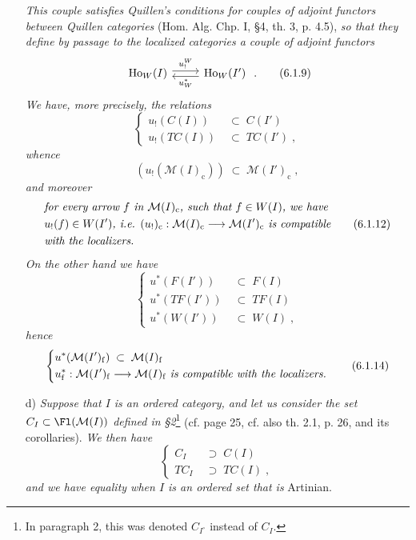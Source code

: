 \begin{itemize}[leftmargin=2.5em]
\textit{This couple satisfies Quillen's conditions for couples of adjoint functors between Quillen categories} (Hom. Alg. Chp. I, §4, th. 3, p. 4.5), \textit{so that they define by passage to the localized categories a couple of adjoint functors}
\[
\begin{tikzcd}
\mathrm{Ho}_W(I) \arrow[r, shift left, "u_!^{W}"] & \mathrm{Ho}_W(I') \arrow[l, shift left, "u^{*}_{W}"]
\end{tikzcd}
\;.
\tag*{(6.1.9)}
\]
\textit{We have, more precisely, the relations}
\[
\left\{
\begin{aligned}
u_!(C(I)) \;&\subset\; C(I')\\
u_!(TC(I)) \;&\subset\; TC(I')\;,
\end{aligned}
\right.
\tag*{(6.1.10)}
\]
\textit{whence}
\[
(u_!(\mathcal{M}(I)_{\mathrm{c}})) \;\subset\; \mathcal{M}(I')_{\mathrm{c}}\;,
\tag*{(6.1.11)}
\]
\textit{and moreover}
\[
\begin{aligned}
&\text{\textit{for every arrow $f$ in $\mathcal{M}(I)_{\mathrm{c}}$, such that $f \in W(I)$, we have}}\\
&\text{\textit{$u_!(f) \in W(I')$, i.e. $(u_!)_{\mathrm{c}} : \mathcal{M}(I)_{\mathrm{c}} \longrightarrow \mathcal{M}(I')_{\mathrm{c}}$ is compatible}}\\
&\text{\textit{with the localizers.}}
\end{aligned}
\tag*{(6.1.12)}
\]
\textit{On the other hand we have}
\[
\left\{
\begin{aligned}
u^{*}(F(I')) \;&\subset\; F(I)\\
u^{*}(TF(I')) \;&\subset\; TF(I)\\
u^{*}(W(I')) \;&\subset\; W(I)\;,
\end{aligned}
\right.
\tag*{(6.1.13)}
\]
\textit{hence}
\[
\left\{
\begin{aligned}
&u^{*}(\mathcal{M}(I')_{\mathrm{f}}) \;\subset\; \mathcal{M}(I)_{\mathrm{f}}\\
&u^{*}_{\mathrm{f}} : \mathcal{M}(I')_{\mathrm{f}} \longrightarrow \mathcal{M}(I)_{\mathrm{f}} \text{ \textit{is compatible with the localizers.}}
\end{aligned}
\right.
\tag*{(6.1.14)}
\]

\item[d)] \textit{Suppose that $I$ is an ordered category, and let us consider the set $C_I \subset \Fl(\mathcal{M}(I))$ defined in §2}\footnote[30]{In paragraph 2, this was denoted $C_{I^{\circ}}$ instead of $C_I$.} (cf. page 25, cf. also th. 2.1, p. 26, and its corollaries). \textit{We then have}
\[
\left\{
\begin{aligned}
C_I \;&\supset\; C(I)\\
TC_I \;&\supset\; TC(I)\;,
\end{aligned}
\right.
\tag*{(6.1.15)}
\]
\textit{and we have equality when $I$ is an ordered set that is} Artinian.
\end{itemize}

